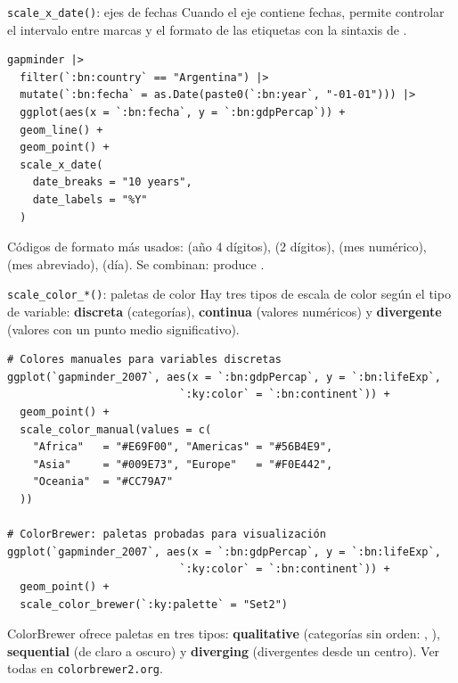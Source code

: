 \documentclass[8pt]{beamer}
\begin{document}
	\begin{frame}[fragile]{\texttt{scale\_x\_date()}: ejes de fechas}
		Cuando el eje  contiene fechas,  permite controlar el intervalo entre marcas y el formato de las etiquetas con la sintaxis de .

\begin{lstlisting}[style=RScript]
gapminder |>
  filter(`:bn:country` == "Argentina") |>
  mutate(`:bn:fecha` = as.Date(paste0(`:bn:year`, "-01-01"))) |>
  ggplot(aes(x = `:bn:fecha`, y = `:bn:gdpPercap`)) +
  geom_line() +
  geom_point() +
  scale_x_date(
    date_breaks = "10 years",
    date_labels = "%Y"
  )
\end{lstlisting}

		\begin{block}{}
			Códigos de formato más usados:  (año 4 dígitos),  (2 dígitos),  (mes numérico),  (mes abreviado),  (día). Se combinan:  produce .
		\end{block}
	\end{frame}


	\begin{frame}[fragile]{\texttt{scale\_color\_*()}: paletas de color}
		Hay tres tipos de escala de color según el tipo de variable: \textbf{discreta} (categorías), \textbf{continua} (valores numéricos) y \textbf{divergente} (valores con un punto medio significativo).

\begin{lstlisting}[style=RScript]
# Colores manuales para variables discretas
ggplot(`gapminder_2007`, aes(x = `:bn:gdpPercap`, y = `:bn:lifeExp`,
                           `:ky:color` = `:bn:continent`)) +
  geom_point() +
  scale_color_manual(values = c(
    "Africa"   = "#E69F00", "Americas" = "#56B4E9",
    "Asia"     = "#009E73", "Europe"   = "#F0E442",
    "Oceania"  = "#CC79A7"
  ))

# ColorBrewer: paletas probadas para visualización
ggplot(`gapminder_2007`, aes(x = `:bn:gdpPercap`, y = `:bn:lifeExp`,
                           `:ky:color` = `:bn:continent`)) +
  geom_point() +
  scale_color_brewer(`:ky:palette` = "Set2")
\end{lstlisting}

		\begin{exampleblock}{}
			ColorBrewer ofrece paletas en tres tipos: \textbf{qualitative} (categorías sin orden: , ), \textbf{sequential} (de claro a oscuro) y \textbf{diverging} (divergentes desde un centro). Ver todas en \texttt{colorbrewer2.org}.
		\end{exampleblock}
	\end{frame}
\end{document}
